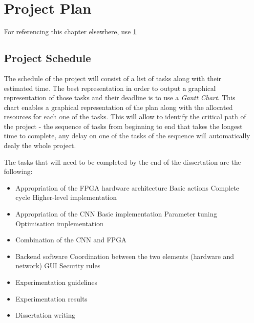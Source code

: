 \chapter{Project Plan}

\label{Chapter5} For referencing this chapter elsewhere, use \ref{Chapter5}



\section{Project Schedule}

The schedule of the project will consist of a list of tasks along with their estimated time. The best representation in order to output a graphical representation of those tasks and their deadline is to use a \emph{Gantt Chart}. This chart enables a graphical representation of the plan along with the allocated resources for each one of the tasks. This will allow to identify the critical path of the project - the sequence of tasks from beginning to end that takes the longest time to complete, any delay on one of the tasks of the sequence will automatically dealy the whole project.

The tasks that will need to be completed by the end of the dissertation are the following:

\begin{itemize}
  \item Appropriation of the FPGA hardware architecture
    \Subitem Basic actions
    \Subitem Complete cycle
    \Subitem Higher-level implementation
  \item Appropriation of the CNN
    \Subitem Basic implementation
    \Subitem Parameter tuning
    \Subitem Optimisation implementation
  \item Combination of the CNN and FPGA
  \item Backend software
    \Subitem Coordination between the two elements (hardware and network)
    \Subitem GUI
    \Subitem Security rules
  \item Experimentation guidelines
  \item Experimentation results
  \item Dissertation writing
\end{itemize}

